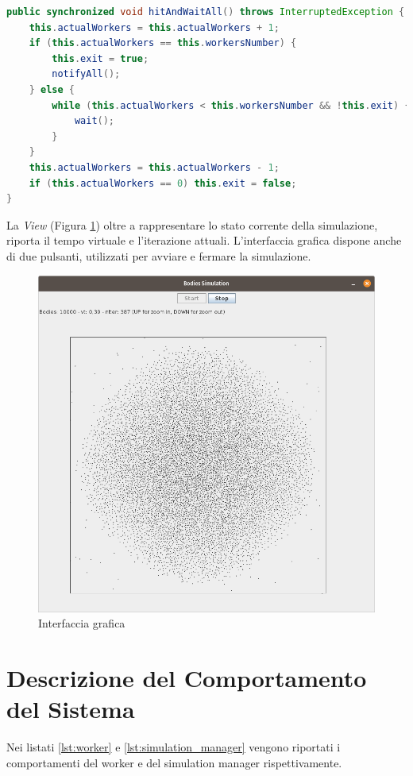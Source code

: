 \documentclass[12pt,a4paper,openright,twoside]{book}
\begin{document}
\begin{lstlisting}[float,
					language=Java,
					label=lst:lst3,caption=Implementazione della barrier]
public synchronized void hitAndWaitAll() throws InterruptedException {
	this.actualWorkers = this.actualWorkers + 1;
	if (this.actualWorkers == this.workersNumber) {
		this.exit = true;
		notifyAll();
	} else {
		while (this.actualWorkers < this.workersNumber && !this.exit) {
			wait();
		}
	}
	this.actualWorkers = this.actualWorkers - 1;
	if (this.actualWorkers == 0) this.exit = false;
}
\end{lstlisting}

La \textit{View} (Figura \ref{fig:gui}) oltre a rappresentare lo stato corrente della simulazione, 
riporta il tempo virtuale e l'iterazione attuali.
L'interfaccia grafica dispone anche di due pulsanti, utilizzati per avviare e fermare la simulazione.

\begin{figure}
	\centering
	\includegraphics[width=\linewidth]{figures/simulation.png}
	\caption{Interfaccia grafica}
	\label{fig:gui}
\end{figure}


\chapter{Descrizione del Comportamento del Sistema} %
\label{chap:Descrizione del Comportamento del Sistema}
Nei listati \ref{lst:worker} e \ref{lst:simulation_manager} vengono riportati i comportamenti del worker e del simulation manager rispettivamente.
\end{document}
